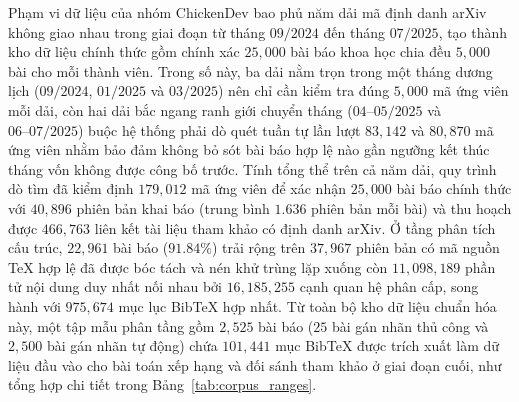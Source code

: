 Phạm vi dữ liệu của nhóm ChickenDev bao phủ năm dải mã định danh arXiv không giao nhau trong giai đoạn từ tháng $09/2024$ đến tháng $07/2025$, tạo thành kho dữ liệu chính thức gồm chính xác $25{,}000$ bài báo khoa học chia đều $5{,}000$ bài cho mỗi thành viên. Trong số này, ba dải nằm trọn trong một tháng dương lịch ($09/2024$, $01/2025$ và $03/2025$) nên chỉ cần kiểm tra đúng $5{,}000$ mã ứng viên mỗi dải, còn hai dải bắc ngang ranh giới chuyển tháng ($04\text{--}05/2025$ và $06\text{--}07/2025$) buộc hệ thống phải dò quét tuần tự lần lượt $83{,}142$ và $80{,}870$ mã ứng viên nhằm bảo đảm không bỏ sót bài báo hợp lệ nào gần ngưỡng kết thúc tháng vốn không được công bố trước. Tính tổng thể trên cả năm dải, quy trình dò tìm đã kiểm định $179{,}012$ mã ứng viên để xác nhận $25{,}000$ bài báo chính thức với $40{,}896$ phiên bản khai báo (trung bình $1.636$ phiên bản mỗi bài) và thu hoạch được $466{,}763$ liên kết tài liệu tham khảo có định danh arXiv. Ở tầng phân tích cấu trúc, $22{,}961$ bài báo ($91.84\%$) trải rộng trên $37{,}967$ phiên bản có mã nguồn TeX hợp lệ đã được bóc tách và nén khử trùng lặp xuống còn $11{,}098{,}189$ phần tử nội dung duy nhất nối nhau bởi $16{,}185{,}255$ cạnh quan hệ phân cấp, song hành với $975{,}674$ mục lục BibTeX hợp nhất. Từ toàn bộ kho dữ liệu chuẩn hóa này, một tập mẫu phân tầng gồm $2{,}525$ bài báo ($25$ bài gán nhãn thủ công và $2{,}500$ bài gán nhãn tự động) chứa $101{,}441$ mục BibTeX được trích xuất làm dữ liệu đầu vào cho bài toán xếp hạng và đối sánh tham khảo ở giai đoạn cuối, như tổng hợp chi tiết trong Bảng~\ref{tab:corpus_ranges}.

